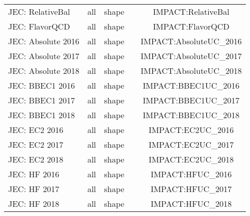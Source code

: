 \begin{table}
\begin{tabular}{l|c|c|c|c}
      JEC: RelativeBal                                    & all                   & shape             &                     & IMPACT:RelativeBal  \\
      JEC: FlavorQCD                                      & all                   & shape             &                     & IMPACT:FlavorQCD  \\
      JEC: Absolute             2016                      & all                   & shape             &                     & IMPACT:AbsoluteUC_2016  \\
      JEC: Absolute             2017                      & all                   & shape             &                     & IMPACT:AbsoluteUC_2017  \\
      JEC: Absolute             2018                      & all                   & shape             &                     & IMPACT:AbsoluteUC_2018  \\
      JEC: BBEC1                2016                      & all                   & shape             &                     & IMPACT:BBEC1UC_2016  \\
      JEC: BBEC1                2017                      & all                   & shape             &                     & IMPACT:BBEC1UC_2017  \\
      JEC: BBEC1                2018                      & all                   & shape             &                     & IMPACT:BBEC1UC_2018  \\
      JEC: EC2                  2016                      & all                   & shape             &                     & IMPACT:EC2UC_2016  \\
      JEC: EC2                  2017                      & all                   & shape             &                     & IMPACT:EC2UC_2017  \\
      JEC: EC2                  2018                      & all                   & shape             &                     & IMPACT:EC2UC_2018  \\
      JEC: HF                   2016                      & all                   & shape             &                     & IMPACT:HFUC_2016  \\
      JEC: HF                   2017                      & all                   & shape             &                     & IMPACT:HFUC_2017  \\
      JEC: HF                   2018                      & all                   & shape             &                     & IMPACT:HFUC_2018  \\

\end{tabular}
\end{table}
